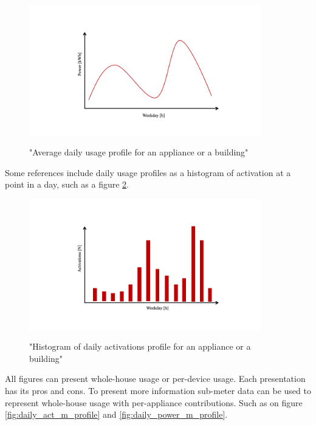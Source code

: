 \begin{figure}[H]
	\centering
	\caption{"Average daily usage profile for an appliance or a building"}
	\includegraphics[width=0.9\textwidth]{Figures/profile_sketches/Slide1.png}
	\label{fig:daily_power_profile}
\end{figure}

Some references include daily usage profiles as a histogram of activation at a point in a day, such as a figure \ref{fig:daily_act_profile}.

\begin{figure}[H]
	\centering
	\caption{"Histogram of daily activations profile for an appliance or a building"}
	\includegraphics[width=0.9\textwidth]{Figures/profile_sketches/Slide5.png}
	\label{fig:daily_act_profile}
\end{figure}

All figures can present whole-house usage or per-device usage. Each presentation has its pros and cons. 
To present more information sub-meter data can be used to represent whole-house usage with per-appliance contributions.
Such as on figure \ref{fig:daily_act_m_profile} and \ref{fig:daily_power_m_profile}.

